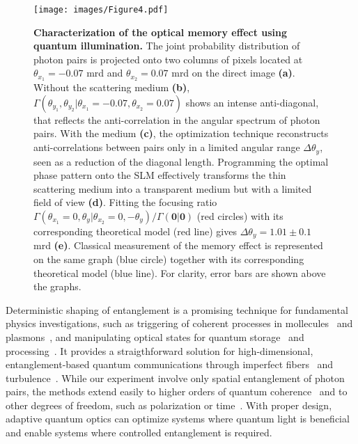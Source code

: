 \documentclass[%
 reprint,
 amsmath,amssymb,
 aps
]{revtex4-1}
\begin{document}
\begin{figure}
\texttt{[image: images/Figure4.pdf]}
\caption{\label{Figure4} \textbf{Characterization of the optical memory effect using quantum illumination.} The joint probability distribution of photon pairs is projected onto two columns of pixels located at $\theta_{x_1}=-0.07$ mrd and $\theta_{x_2}=0.07$ mrd on the direct image \textbf{(a)}. Without the scattering medium \textbf{(b)}, $\Gamma(\theta_{y_1},\theta_{y_2}|\theta_{x_1} = -0.07,\theta_{x_2}=0.07)$ shows an intense anti-diagonal, that reflects the anti-correlation in the angular spectrum of photon pairs. With the medium \textbf{(c)}, the optimization technique reconstructs anti-correlations between pairs only in a limited angular range $\Delta \theta_y$, seen as a reduction of the diagonal length. Programming the optimal phase pattern onto the SLM effectively transforms the thin scattering medium into a transparent medium but with a limited field of view \textbf{(d)}. Fitting the focusing ratio $\Gamma(\theta_{x_1}=0,\theta_{y}|\theta_{x_2}=0,-\theta_{y})/\Gamma(\boldsymbol{0}|\boldsymbol{0})$ (red circles) with its corresponding theoretical model (red line) gives $\Delta \theta_y= 1.01 \pm 0.1$ mrd \textbf{(e)}. Classical measurement of the memory effect is represented on the same graph (blue circle) together with its corresponding theoretical model (blue line). For clarity, error bars are shown above the graphs.}
\end{figure} 

Deterministic shaping of entanglement is a promising technique for fundamental physics investigations, such as triggering of coherent processes in mollecules~\cite{roslyak_nonlinear_2009} and plasmons~\cite{altewischer_plasmon-assisted_2002}, and manipulating optical states for quantum storage~\cite{hildner_quantum_2013} and processing~\cite{abouraddy_single-photon_2017}. It provides a straigthforward solution for high-dimensional, entanglement-based quantum communications through imperfect fibers~\cite{amitonova_multimode-fiber-based_2018} and turbulence~\cite{krenn_twisted_2015}. While our experiment involve only spatial entanglement of photon pairs, the methods extend easily to higher orders of quantum coherence~\cite{nagata_beating_2007} and to other degrees of freedom, such as polarization or time~\cite{peer_temporal_2005}. With proper design, adaptive quantum optics can optimize systems where quantum light is beneficial and enable systems where controlled entanglement is required.
\end{document}
